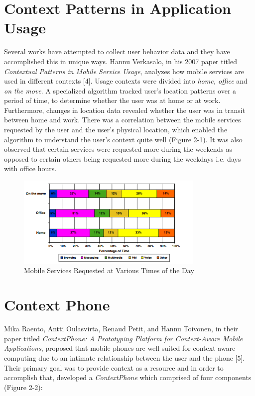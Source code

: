 \documentclass[12pt]{uthesis-v12}  %
\begin{document}
	\section{Context Patterns in Application Usage}
		Several works have attempted to collect user behavior data and they have accomplished this in unique ways. Hannu Verkasalo, in his 2007 paper titled {\em Contextual Patterns in Mobile Service Usage}, analyzes how mobile services are used in different contexts [4]. Usage contexts were divided into {\em home, office} and {\em on the move}. A specialized algorithm tracked user's location patterns over a period of time, to determine whether the user was at home or at work. Furthermore, changes in location data revealed whether the user was in transit between home and work. There was a correlation between the mobile services requested by the user and the user's physical location, which enabled the algorithm to understand the user's context quite well (Figure 2-1). It was also observed that certain services were requested more during the weekends as opposed to certain others being requested more during the weekdays i.e. days with office hours.  
		
		\begin{figure}[!ht]
			\centering
			\includegraphics[width = 90mm]{images/appsByTime.png}
			\caption[Mobile Services Requested at Various Times of the Day]
			{Mobile Services Requested at Various Times of the Day}
		\end{figure}
	
	\section{Context Phone}
		Mika Raento, Antti Oulasvirta, Renaud Petit, and Hannu Toivonen, in their paper titled {\em ContextPhone: A Prototyping Platform for Context-Aware Mobile Applications}, proposed that mobile phones are well suited for context aware computing due to an intimate relationship between the user and the phone [5]. Their primary goal was to provide context as a resource and in order to accomplish that, developed a {\em ContextPhone} which comprised of four components (Figure 2-2):
		
\end{document}
